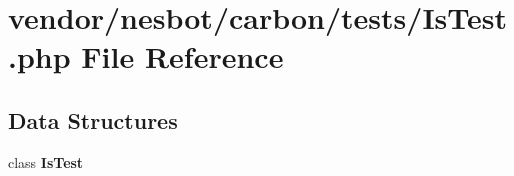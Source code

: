 \section{vendor/nesbot/carbon/tests/\+Is\+Test.php File Reference}
\label{_is_test_8php}
\subsection*{Data Structures}
\begin{DoxyCompactItemize}
\item 
class {\bf Is\+Test}
\end{DoxyCompactItemize}
